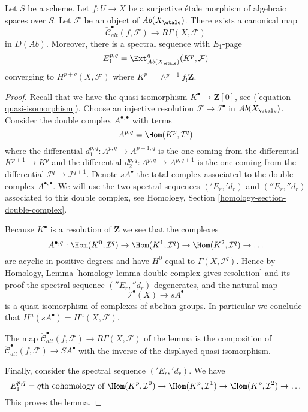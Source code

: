 \begin{lemma}
\label{lemma-alternating-cech-to-cohomology}
Let $S$ be a scheme. Let $f : U \to X$ be a surjective \'etale morphism
of algebraic spaces over $S$. Let $\mathcal{F}$ be an object of
$\textit{Ab}(X_\etale)$. There exists a canonical map
$$
\check{\mathcal{C}}^\bullet_{alt}(f, \mathcal{F})
\longrightarrow
R\Gamma(X, \mathcal{F})
$$
in $D(\textit{Ab})$. Moreover, there is a spectral sequence with $E_1$-page
$$
E_1^{p, q} =
\Ext_{\textit{Ab}(X_\etale)}^q(K^p, \mathcal{F})
$$
converging to $H^{p + q}(X, \mathcal{F})$ where
$K^p = \wedge^{p + 1}f_!\underline{\mathbf{Z}}$.
\end{lemma}

\begin{proof}
Recall that we have the quasi-isomorphism
$K^\bullet \to \underline{\mathbf{Z}}[0]$, see
(\ref{equation-quasi-isomorphism}).
Choose an injective resolution $\mathcal{F} \to \mathcal{I}^\bullet$
in $\textit{Ab}(X_\etale)$. Consider the double complex
$A^{\bullet, \bullet}$ with terms
$$
A^{p, q} = \Hom(K^p, \mathcal{I}^q)
$$
where the differential $d_1^{p, q} : A^{p, q} \to A^{p + 1, q}$
is the one coming from the differential $K^{p + 1} \to K^p$
and the differential $d_2^{p, q} : A^{p, q} \to A^{p, q + 1}$ is the
one coming from the differential
$\mathcal{I}^q \to \mathcal{I}^{q + 1}$.
Denote $sA^\bullet$ the total complex associated to
the double complex $A^{\bullet, \bullet}$.
We will use the two spectral
sequences $({}'E_r, {}'d_r)$ and $({}''E_r, {}''d_r)$
associated to this double complex, see
Homology, Section \ref{homology-section-double-complex}.

\medskip\noindent
Because $K^\bullet$ is a resolution of $\underline{\mathbf{Z}}$
we see that the complexes
$$
A^{\bullet, q} :
\Hom(K^0, \mathcal{I}^q) \to
\Hom(K^1, \mathcal{I}^q) \to
\Hom(K^2, \mathcal{I}^q) \to \ldots
$$
are acyclic in positive degrees and have $H^0$ equal to
$\Gamma(X, \mathcal{I}^q)$. Hence by
Homology, Lemma \ref{homology-lemma-double-complex-gives-resolution}
and its proof the spectral sequence $({}''E_r, {}''d_r)$ degenerates,
and the natural map
$$
\mathcal{I}^\bullet(X) \longrightarrow sA^\bullet
$$
is a quasi-isomorphism of complexes of abelian groups. In particular
we conclude that $H^n(sA^\bullet) = H^n(X, \mathcal{F})$.

\medskip\noindent
The map $\check{\mathcal{C}}^\bullet_{alt}(f, \mathcal{F}) \to
R\Gamma(X, \mathcal{F})$ of the lemma is the composition of
$\check{\mathcal{C}}^\bullet_{alt}(f, \mathcal{F}) \to SA^\bullet$
with the inverse of the displayed quasi-isomorphism.

\medskip\noindent
Finally, consider the spectral sequence $({}'E_r, {}'d_r)$.
We have
$$
E_1^{p, q} = q\text{th cohomology of }
\Hom(K^p, \mathcal{I}^0) \to
\Hom(K^p, \mathcal{I}^1) \to
\Hom(K^p, \mathcal{I}^2) \to \ldots
$$
This proves the lemma.
\end{proof}

